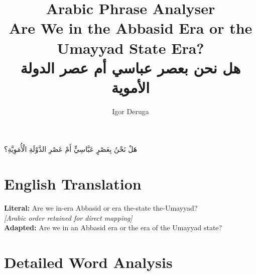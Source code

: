 \documentclass[letterpaper,12pt]{article}
\begin{document}
\title{\textbf{\Large Arabic Phrase Analyser}\\
\large Are We in the Abbasid Era or the Umayyad State Era?\\
\normalsize \textarabic{هل نحن بعصر عباسي أم عصر الدولة الأموية}}
\author{Igor Deruga}
\date{}
\maketitle

\begin{tcolorbox}[colback=boxcolor,colframe=headercolor,title=\textbf{Arabic Phrase with Full Diacritics},breakable]
\centering
\Large\textarabic{هَلْ نَحْنُ بِعَصْرٍ عَبَّاسِيٍّ أَمْ عَصْرِ الدَّوْلَةِ الْأُمَوِيَّةِ؟}
\end{tcolorbox}

\section{English Translation}
\begin{tcolorbox}[colback=white,colframe=accentcolor,breakable]
\textbf{Literal:} Are we in-era Abbasid or era the-state the-Umayyad?\\
\textit{[Arabic order retained for direct mapping]}\\[0.5em]
\textbf{Adapted:} Are we in an Abbasid era or the era of the Umayyad state?
\end{tcolorbox}

\section{Detailed Word Analysis}
\end{document}
